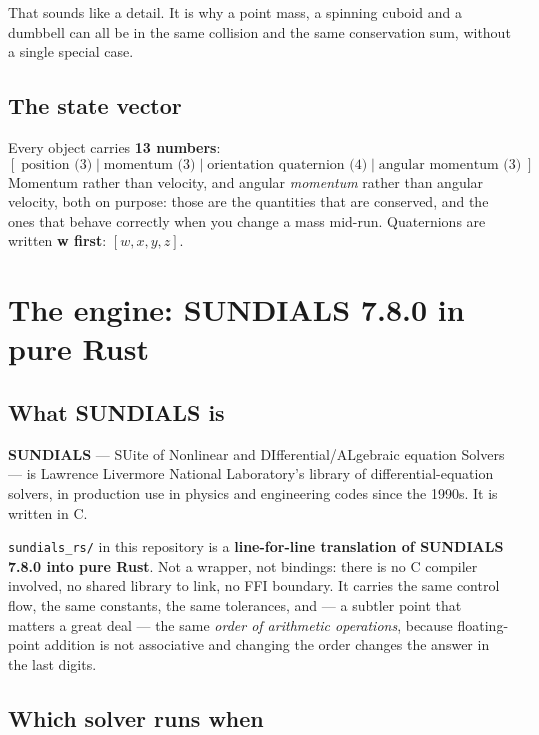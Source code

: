 \documentclass[11pt]{article}
\newcommand{\code}[1]{\texttt{#1}}
\begin{document}
That sounds like a detail. It is why a point mass, a spinning cuboid and
a dumbbell can all be in the same collision and the same conservation
sum, without a single special case.

\subsection{The state vector}

Every object carries \textbf{13 numbers}:
\[
[\;\text{position (3)}\;|\;\text{momentum (3)}\;|\;
  \text{orientation quaternion (4)}\;|\;\text{angular momentum (3)}\;]
\]
Momentum rather than velocity, and angular \emph{momentum} rather than
angular velocity, both on purpose: those are the quantities that are
conserved, and the ones that behave correctly when you change a mass
mid-run. Quaternions are written \textbf{w first}: $[w,x,y,z]$.

\section{The engine: SUNDIALS 7.8.0 in pure Rust}\label{sec:engine}

\subsection{What SUNDIALS is}

\textbf{SUNDIALS} --- SUite of Nonlinear and DIfferential/ALgebraic
equation Solvers --- is Lawrence Livermore National Laboratory's library
of differential-equation solvers, in production use in physics and
engineering codes since the 1990s. It is written in C.

\code{sundials\_rs/} in this repository is a \textbf{line-for-line
translation of SUNDIALS 7.8.0 into pure Rust}. Not a wrapper, not
bindings: there is no C compiler involved, no shared library to link, no
FFI boundary. It carries the same control flow, the same constants, the
same tolerances, and --- a subtler point that matters a great deal ---
the same \emph{order of arithmetic operations}, because floating-point
addition is not associative and changing the order changes the answer in
the last digits.

\subsection{Which solver runs when}
\end{document}
